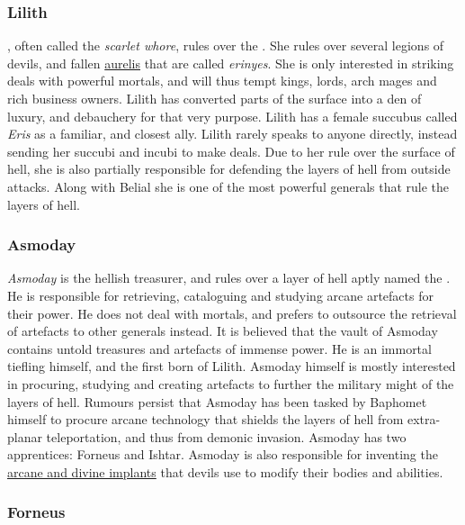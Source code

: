 \subsubsection{Lilith}

, often called the \emph{scarlet whore}, rules over the
. She rules over several legions of devils, and
fallen \hyperref[sec:Aurelis]{aurelis} that are called \emph{erinyes}. She is
only interested in striking deals with powerful mortals, and will thus tempt
kings, lords, arch mages and rich business owners. Lilith has converted parts
of the surface into a den of luxury, and debauchery for that very purpose.
Lilith has a female succubus called \emph{Eris} as a familiar, and closest
ally. Lilith rarely speaks to anyone directly, instead sending her succubi and
incubi to make deals. Due to her rule over the surface of hell, she is also
partially responsible for defending the layers of hell from outside
attacks. Along with Belial she is one of the most powerful generals that rule
the layers of hell.

\subsubsection{Asmoday}
\label{sec:Asmoday}

\emph{Asmoday} is the hellish treasurer, and rules over a layer of hell aptly
named the . He is responsible for retrieving,
cataloguing and studying arcane artefacts for their power. He does not deal
with mortals, and prefers to outsource the retrieval of artefacts to other
generals instead. It is believed that the vault of Asmoday contains untold
treasures and artefacts of immense power. He is an immortal tiefling himself,
and the first born of Lilith. Asmoday himself is mostly interested in
procuring, studying and creating artefacts to further the military might of
the layers of hell. Rumours persist that Asmoday has been tasked by Baphomet
himself to procure arcane technology that shields the layers of hell from
extra-planar teleportation, and thus from demonic invasion. Asmoday has two
apprentices: Forneus and Ishtar. Asmoday is also responsible for inventing the
\hyperref[sec:Implants]{arcane and divine implants} that devils use to modify
their bodies and abilities.

\subsubsection{Forneus}

